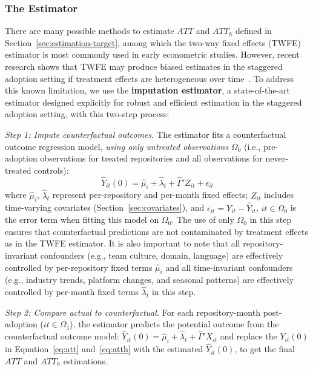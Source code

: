 \subsubsection{The \citet{borusyak2024revisiting} Estimator}
\label{sec:borusyak}

There are many possible methods to estimate $ATT$ and $ATT_h$ defined in Section~\ref{sec:estimation-target}, among which the two-way fixed effects (TWFE) estimator is most commonly used in early econometric studies.
However, recent research shows that TWFE may produce biased estimates in the staggered adoption setting if treatment effects are heterogeneous over time~\cite{dechaisemartin2020two, athey2022design, goodman2021difference}. %
To address this known limitation, we use the \textbf{\citet{borusyak2024revisiting} imputation estimator}, a state-of-the-art estimator designed explicitly for robust and efficient estimation in the staggered adoption setting, with this two-step process:

\textit{Step 1: Impute counterfactual outcomes.} The estimator fits a counterfactual outcome regression model, \emph{using only untreated observations} $\Omega_0$ (i.e., pre-adoption observations for treated repositories and all observations for never-treated controls):
\begin{equation}
\label{eq:imputation}
\hat{Y}_{it}(0) = \hat{\mu}_i + \hat{\lambda}_t + \hat{\Gamma}' Z_{it} + \epsilon_{it}
\end{equation}
where $\hat{\mu}_i$, $\hat{\lambda}_t$ represent per-repository and per-month fixed effects; $Z_{it}$ includes time-varying covariates (Section~\ref{sec:covariates}), and $\epsilon_{it}=Y_{it}-\hat Y_{it}$, $it\in\Omega_0$ is the error term when fitting this model on $\Omega_0$. 
The use of only $\Omega_0$ in this step ensures that counterfactual predictions are not contaminated by treatment effects as in the TWFE estimator.
It is also important to note that all repository-invariant confounders (e.g., team culture, domain, language) are effectively controlled by per-repository fixed terms $\hat\mu_i$ and all time-invariant confounders (e.g., industry trends, platform changes, and seasonal patterns) are effectively controlled by per-month fixed terms $\hat{\lambda}_t$ in this step.

\textit{Step 2: Compare actual to counterfactual.} For each repository-month post-adoption ($it\in\Omega_1$), the estimator predicts the potential outcome from the counterfactual outcome model: $\hat{Y}_{it}(0) = \hat{\mu}_i + \hat{\lambda}_t + \hat{\Gamma}' X_{it}$ and replace the $Y_{it}(0)$  in Equation~\ref{eq:att} and~\ref{eq:atth} with the estimated $\hat{Y}_{it}(0)$, to get the final $ATT$ and $ATT_h$ estimations.

